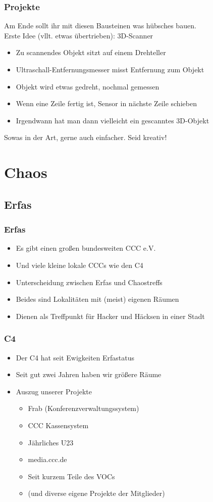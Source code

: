 \documentclass[ngerman,compress]{beamer}
\begin{document}
\begin{frame}
	\frametitle{Projekte}
	Am Ende sollt ihr mit diesen Bausteinen was hübsches bauen. \\
	Erste Idee (vllt. etwas übertrieben): 3D-Scanner
	\begin{itemize}
		\item Zu scannendes Objekt sitzt auf einem Drehteller
		\item Ultraschall-Entfernungsmesser misst Entfernung zum Objekt
		\item Objekt wird etwas gedreht, nochmal gemessen
		\item Wenn eine Zeile fertig ist, Sensor in nächste Zeile schieben
		\item Irgendwann hat man dann vielleicht ein gescanntes 3D-Objekt
	\end{itemize}
	Sowas in der Art, gerne auch einfacher. Seid kreativ!
\end{frame}


\section{Chaos}

\subsection{Erfas}

\begin{frame}
	\frametitle{Erfas}
	\begin{itemize}
		\item Es gibt einen großen bundesweiten CCC e.V.
		\item Und viele kleine lokale CCCs wie den C4
		\item Unterscheidung zwischen Erfas und Chaostreffs
		\item Beides sind Lokalitäten mit (meist) eigenen Räumen
		\item Dienen als Treffpunkt für Hacker und Häcksen in einer Stadt
	\end{itemize}
\end{frame}


\begin{frame}
	\frametitle{C4}
	\begin{itemize}
		\item Der C4 hat seit Ewigkeiten Erfastatus
		\item Seit gut zwei Jahren haben wir größere Räume
		\item Auszug unserer Projekte
		\begin{itemize}
			\item Frab (Konferenzverwaltungssystem)
			\item CCC Kassensystem
			\item Jährliches U23
			\item media.ccc.de
			\item Seit kurzem Teile des VOCs
			\item (und diverse eigene Projekte der Mitglieder)
		\end{itemize}
	\end{itemize}
\end{frame}
\end{document}
